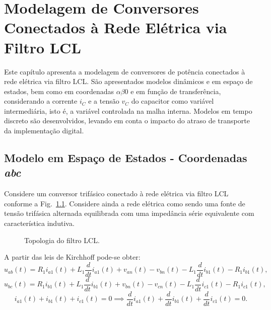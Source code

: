
\chapter{Modelagem de Conversores Conectados à Rede Elétrica via Filtro LCL}\label{modelagem}

	Este capítulo apresenta a modelagem de conversores de potência conectados à rede elétrica via filtro LCL. São apresentados modelos dinâmicos e em espaço de estados, bem como em coordenadas $\alpha \beta 0$ \cite{ref:JORGE} e em função de transferência, considerando a corrente $i_C$ e a tensão $v_C$ do capacitor como variável intermediária, isto é, a variável controlada na malha interna. Modelos em tempo discreto são desenvolvidos, levando em conta o impacto do atraso de transporte da implementação digital.


\section{Modelo em Espaço de Estados - Coordenadas \emph{abc}}

  Considere um conversor trifásico conectado à rede elétrica via filtro LCL conforme a Fig.~\ref{fig:LCL_topologia_2}. Considere ainda a rede elétrica como sendo uma fonte de tensão trifásica alternada equilibrada com uma impedância série equivalente com característica indutiva.

  \begin{figure}[htb]
    \centering{
      \def\svgwidth{\textwidth}
      }
    \renewcommand\figurename{Fig.}
    \caption{Topologia do filtro LCL.}
    \label{fig:LCL_topologia_2}
  \end{figure}

  A partir das leis de Kirchhoff pode-se obter:
  \begin{equation}
    u_{ab}(t) = R_1 i_{a1}(t) + L_1 \frac{d}{dt} i_{a1}(t) + v_{an}(t)
      - v_{bn}(t) - L_1 \frac{d}{dt} i_{b1}(t) - R_1 i_{b1}(t) \text{,}
  \end{equation}
  \begin{equation}
    u_{bc}(t) = R_1 i_{b1}(t) + L_1 \frac{d}{dt} i_{b1}(t) + v_{bn}(t)
      - v_{cn}(t) - L_1 \frac{d}{dt} i_{c1}(t) - R_1 i_{c1}(t) \text{,}
  \end{equation}
  \begin{equation}
    i_{a1}(t) + i_{b1}(t) + i_{c1}(t) = 0 \implies \frac{d}{dt} i_{a1}(t)
      + \frac{d}{dt} i_{b1}(t) + \frac{d}{dt} i_{c1}(t) = 0 \text{.}
  \end{equation}

